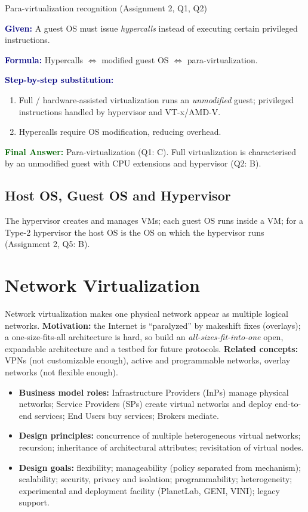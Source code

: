 \documentclass[11pt,a4paper,openany]{report}
\newcommand{\Given}{\par\textbf{\textcolor{navy}{Given:}} }
\newcommand{\Formula}{\par\textbf{\textcolor{navy}{Formula:}} }
\newcommand{\Steps}{\par\textbf{\textcolor{navy}{Step-by-step substitution:}}\par}
\newcommand{\Answer}{\par\textbf{\textcolor{darkgreen}{Final Answer:}} }
\begin{document}
\begin{solved}{Para-virtualization recognition (Assignment 2, Q1, Q2)}
\Given A guest OS must issue \emph{hypercalls} instead of executing certain privileged instructions.
\Formula Hypercalls $\Leftrightarrow$ modified guest OS $\Leftrightarrow$ para-virtualization.
\Steps
\begin{enumerate}[leftmargin=*]
  \item Full / hardware-assisted virtualization runs an \emph{unmodified} guest; privileged instructions handled
        by hypervisor and VT-x/AMD-V.
  \item Hypercalls require OS modification, reducing overhead.
\end{enumerate}
\Answer Para-virtualization (Q1: C). Full virtualization is characterised by an unmodified guest with
CPU extensions and hypervisor (Q2: B).
\end{solved}

\subsection{Host OS, Guest OS and Hypervisor}
The hypervisor creates and manages VMs; each guest OS runs inside a VM; for a Type-2 hypervisor the host OS is
the OS on which the hypervisor runs (Assignment 2, Q5: B).

\section{Network Virtualization}
Network virtualization makes one physical network appear as multiple logical networks.
\textbf{Motivation:} the Internet is ``paralyzed'' by makeshift fixes (overlays); a one-size-fits-all
architecture is hard, so build an \emph{all-sizes-fit-into-one} open, expandable architecture and a testbed for
future protocols. \textbf{Related concepts:} VPNs (not customizable enough), active and programmable networks,
overlay networks (not flexible enough).

\begin{itemize}[leftmargin=*]
  \item \textbf{Business model roles:} Infrastructure Providers (InPs) manage physical networks; Service
        Providers (SPs) create virtual networks and deploy end-to-end services; End Users buy services; Brokers
        mediate.
  \item \textbf{Design principles:} concurrence of multiple heterogeneous virtual networks; recursion; inheritance
        of architectural attributes; revisitation of virtual nodes.
  \item \textbf{Design goals:} flexibility; manageability (policy separated from mechanism); scalability;
        security, privacy and isolation; programmability; heterogeneity; experimental and deployment
        facility (PlanetLab, GENI, VINI); legacy support.
\end{itemize}
\end{document}
